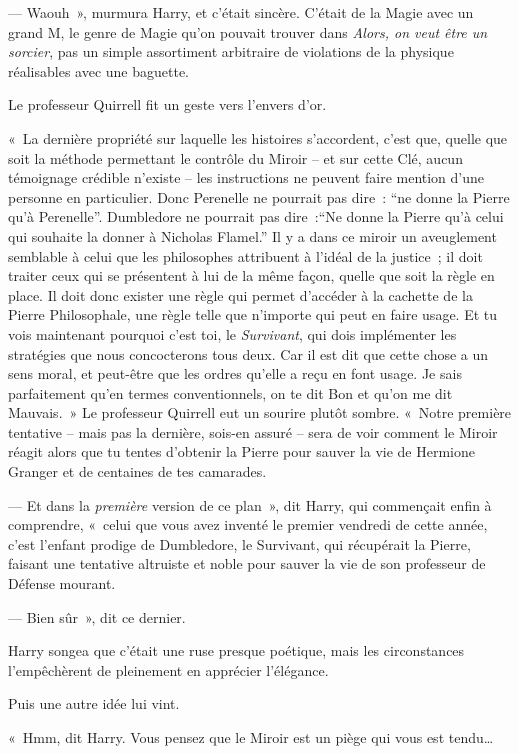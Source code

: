 --- Waouh~», murmura Harry, et c'était sincère. C'était de la Magie avec un grand M, le genre de Magie qu'on pouvait trouver dans \emph{Alors, on veut être un sorcier}, pas un simple assortiment arbitraire de violations de la physique réalisables avec une baguette.

Le professeur Quirrell fit un geste vers l'envers d'or.

«~La dernière propriété sur laquelle les histoires s'accordent, c'est que, quelle que soit la méthode permettant le contrôle du Miroir -- et sur cette Clé, aucun témoignage crédible n'existe -- les instructions ne peuvent faire mention d'une personne en particulier. Donc Perenelle ne pourrait pas dire~: “ne donne la Pierre qu'à Perenelle”. Dumbledore ne pourrait pas dire~:“Ne donne la Pierre qu'à celui qui souhaite la donner à Nicholas Flamel.” Il y a dans ce miroir un aveuglement semblable à celui que les philosophes attribuent à l'idéal de la justice~; il doit traiter ceux qui se présentent à lui de la même façon, quelle que soit la règle en place. Il doit donc exister une règle qui permet d'accéder à la cachette de la Pierre Philosophale, une règle telle que n'importe qui peut en faire usage. Et tu vois maintenant pourquoi c'est toi, le \emph{Survivant}, qui dois implémenter les stratégies que nous concocterons tous deux. Car il est dit que cette chose a un sens moral, et peut-être que les ordres qu'elle a reçu en font usage. Je sais parfaitement qu'en termes conventionnels, on te dit Bon et qu'on me dit Mauvais.~» Le professeur Quirrell eut un sourire plutôt sombre. «~Notre première tentative -- mais pas la dernière, sois-en assuré -- sera de voir comment le Miroir réagit alors que tu tentes d'obtenir la Pierre pour sauver la vie de Hermione Granger et de centaines de tes camarades.

--- Et dans la \emph{première} version de ce plan~», dit Harry, qui commençait enfin à comprendre, «~celui que vous avez inventé le premier vendredi de cette année, c'est l'enfant prodige de Dumbledore, le Survivant, qui récupérait la Pierre, faisant une tentative altruiste et noble pour sauver la vie de son professeur de Défense mourant.

--- Bien sûr~», dit ce dernier.

Harry songea que c'était une ruse presque poétique, mais les circonstances l'empêchèrent de pleinement en apprécier l'élégance.

Puis une autre idée lui vint.

«~Hmm, dit Harry. Vous pensez que le Miroir est un piège qui vous est tendu…

